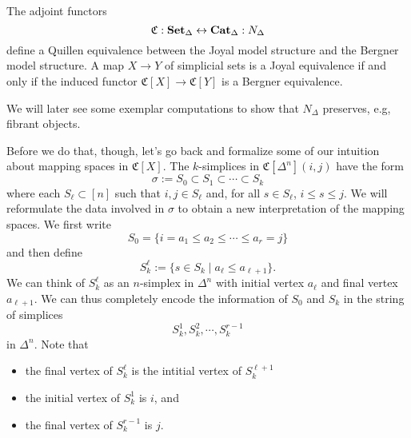 \begin{theorem}[\cite{???}]
	The adjoint functors  
	\[
	\mathfrak{C} : \operatorname{\mathbf{Set}_{\Delta}} \leftrightarrow \operatorname{\mathbf{Cat}_{\Delta}} : N_{\Delta}
	\]
	define a Quillen equivalence between the Joyal model structure and the Bergner model structure. A map $X\to Y$ of simplicial sets is a Joyal equivalence if and only if the induced functor $\mathfrak{C}[X]\to \mathfrak{C}[Y]$ is a Bergner equivalence. 
\end{theorem}

We will later see some exemplar computations to show that $N_\Delta$ preserves, e.g, fibrant objects. 

Before we do that, though, let's go back and formalize some of our intuition about mapping spaces in $\mathfrak{C}[X]$. The $k$-simplices in $\mathfrak{C}[\Delta^n](i,j)$ have the form
\[
\sigma:=S_0\subset S_1\subset\cdots \subset S_k
\]
where each $S_\ell\subset [n]$ such that $i,j\in S_\ell$ and, for all $s\in S_\ell$, $i\leq s\leq j$. We will reformulate the data involved in $\sigma$ to obtain a new interpretation of the mapping spaces. We first write 
\[
S_0= \{i=a_1\leq a_2\leq\cdots\leq a_r=j\}
\] 
and then define 
\[
S_k^\ell:=\{s\in S_k \mid a_\ell \leq a_{\ell+1}\}.
\]
We can think of $S_k^\ell$ as an $n$-simplex in $\Delta^n$ with initial vertex $a_\ell$ and final vertex $a_{\ell+1}$. We can thus completely encode the information of $S_0$ and $S_k$ in the string of simplices 
\[
S_k^1, S_k^2, \cdots, S_k^{r-1} 
\] 
in $\Delta^n$. Note that 
\begin{itemize}
	\item the final vertex of $S_k^\ell$ is the intitial vertex of $S_k^{\ell+1}$
	\item the initial vertex of $S_k^1$ is $i$, and 
	\item the final vertex of $S_k^{r-1}$ is $j$.  
\end{itemize}

